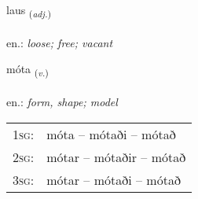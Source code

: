 \documentclass[frontgrid, backgrid]{flacards}\usepackage[]{graphicx}\usepackage[]{xcolor}
\begin{document}
\renewcommand{\blhead}{\vskip5pt {\small\bfseries\footnotesize Lýsingarorð | Adjective }}
\renewcommand{\bcfoot}{\vskip5pt \hspace{2pt}{\small\bfseries\footnotesize 1K}}


{laus \small{\textsubscript{(\textit{adj.})}} \\[1ex] %
\textphonetic{[lœiːs]} \\
en.: \emph{loose; free; vacant} \\  [2ex]
\renewcommand*{\arraystretch}{0.8}
}

\renewcommand{\flhead}{\vskip5pt \fboxsep=0pt {\small\bfseries\footnotesize Sagnorð | Verb}}
\renewcommand{\fcfoot}{\vskip5pt \fboxsep=0pt \hspace{2pt}{\small\bfseries\footnotesize 1K}}

\renewcommand{\blhead}{\vskip5pt {\small\bfseries\footnotesize Sagnorð | Verb }}
\renewcommand{\bcfoot}{\vskip5pt \hspace{2pt}{\small\bfseries\footnotesize 1K}}


{móta \small{\textsubscript{(\textit{v.})}} \\[1ex] %
\textphonetic{[mouːta]} \\
en.: \emph{form, shape; model} \\  [2ex]
\renewcommand*{\arraystretch}{0.8}
\begin{tabular}{p{1cm}l}
\textsc{1sg}: & móta -- mótaði -- mótað \\ 
\textsc{2sg}: & mótar -- mótaðir -- mótað \\ 
\textsc{3sg}: & mótar -- mótaði -- mótað \\ 
\end{tabular}
}
\end{document}
